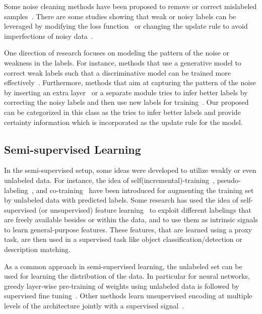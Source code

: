 Some noise cleaning methods have been proposed to remove or correct mislabeled samples~\citep{Brodley:1999}.
There are some studies showing that weak or noisy labels can be leveraged by modifying the loss function~\citep{reed2014training, Patrini:2016, patrini2016loss, Vahdat:2017} or changing the update rule to avoid imperfections of noisy data~\citep{malach2017decoupling, Dehghani:2017:nips_metalearn, Dehghani:2017avoiding}.  

One direction of research focuses on modeling the pattern of the noise or weakness in the labels. For instance, methods that use a generative model to correct weak labels such that a discriminative model can be trained more effectively~\citep{Ratner:2016,Rekatsinas:2017,Varma:2017}.
Furthermore, methods that aim at capturing the pattern of the noise by inserting an extra layer~\citep{goldberger2016training} or a separate module tries to infer better labels by correcting the noisy labels and then use new labels for training~\citep{Sukhbaatar:2014,Veit:2017, Dehghani:2017:nips_metalearn}. Our proposed \fwl can be categorized in this class as the \tch tries to infer better labels and provide certainty information which is incorporated as the update rule for the \std model.

\subsection{Semi-\:supervised Learning}
In the semi-supervised setup, some ideas were developed to utilize weakly or even unlabeled data. For instance, the idea of self(incremental)-training~\citep{Rosenberg:2005}, pseudo-labeling~\citep{Lee:2013,Hinton:2015}, and co-training~\citep{Blum:1998} have been introduced for augmenting the training set by unlabeled data with predicted labels.
Some research has used the idea of self-supervised (or unsupervised) feature learning~\citep{noroozi2016unsupervised,dosovitskiy2016discriminative,donahue2016adversarial} to exploit different labelings that are freely available besides or within the data, and to use them as intrinsic signals to learn general-purpose features. These features, that are learned using a proxy task, are then used in a supervised task like object classification/detection or description matching.

As a common approach in semi-supervised learning, the unlabeled set can be used for learning the distribution of the data. In particular for neural networks, greedy layer-wise pre-training of weights using unlabeled data is followed by supervised fine tuning~\citep{Hinton:2006,Deriu:2017,Severyn:2015:SemEval,Severyn:2015:SIGIR,Go:2009}. Other methods learn unsupervised encoding at multiple levels of the architecture jointly with a supervised signal~\citep{Ororbia:2015,Weston:2012}.


